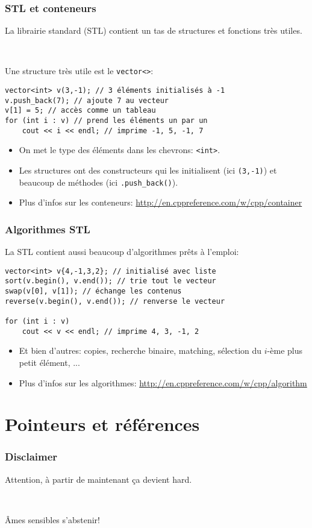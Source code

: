 \documentclass[12pt]{beamer}
\begin{document}
\begin{frame}[fragile]
\frametitle{STL et conteneurs}
La librairie standard (STL) contient un tas de structures et fonctions très utiles.

~

Une structure très utile est le \lstinline|vector<>|:
\begin{lstlisting}
vector<int> v(3,-1); // 3 éléments initialisés à -1
v.push_back(7); // ajoute 7 au vecteur
v[1] = 5; // accès comme un tableau
for (int i : v) // prend les éléments un par un
    cout << i << endl; // imprime -1, 5, -1, 7
\end{lstlisting}
\begin{itemize}
\item On met le type des éléments dans les chevrons: \lstinline|<int>|.
\item Les structures ont des constructeurs qui les initialisent (ici \lstinline|(3,-1)|) et beaucoup de méthodes (ici \lstinline|.push_back()|).
\item Plus d'infos sur les conteneurs: \url{http://en.cppreference.com/w/cpp/container}
\end{itemize}
\end{frame}

\begin{frame}[fragile]
\frametitle{Algorithmes STL}
La STL contient aussi beaucoup d'algorithmes prêts à l'emploi:
\begin{lstlisting}
vector<int> v{4,-1,3,2}; // initialisé avec liste
sort(v.begin(), v.end()); // trie tout le vecteur
swap(v[0], v[1]); // échange les contenus
reverse(v.begin(), v.end()); // renverse le vecteur

for (int i : v)
    cout << v << endl; // imprime 4, 3, -1, 2
\end{lstlisting}
\begin{itemize}
\item Et bien d'autres: copies, recherche binaire, matching, sélection du $i$-ème plus petit élément, ...
\item Plus d'infos sur les algorithmes: \url{http://en.cppreference.com/w/cpp/algorithm}
\end{itemize}
\end{frame}


\section{Pointeurs et références}

\begin{frame}
\frametitle{Disclaimer}
Attention, à partir de maintenant ça devient hard.

~

Âmes sensibles s'abstenir!
\end{frame}
\end{document}
